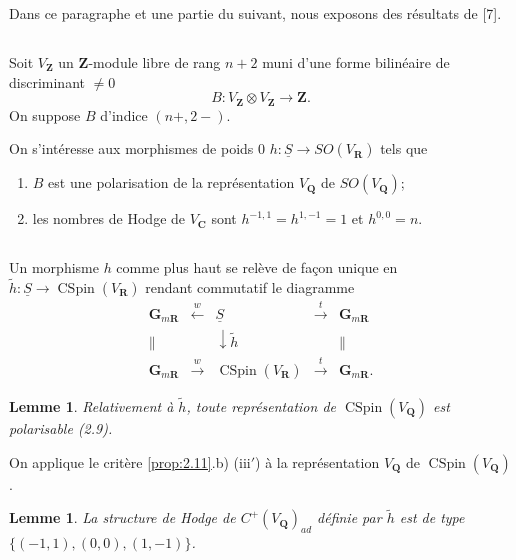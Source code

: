 \documentclass[11pt]{amsart}
\theoremstyle{plain}
\newtheorem{lemme}[theoreme]{Lemme}
\theoremstyle{definition}
\theoremstyle{remark}
\begin{document}
Dans ce paragraphe et une partie du suivant, nous exposons des r\'esultats de [7].

\subsection*{}
Soit $V_\mathbf{Z}$ un $\mathbf{Z}$-module libre de rang $n+2$ muni d'une forme bilin\'eaire de discriminant $\neq0$
\begin{equation*}
B\colon V_\mathbf{Z}\otimes V_\mathbf{Z}\to\mathbf{Z}.
\end{equation*}
On suppose $B$ d'indice $(n+,2-)$.

On s'int\'eresse aux morphismes de poids $0$ $h\colon\underline{S}\to SO(V_\mathbf{R})$ tels que
\begin{enumerate}
\item $B$ est une polarisation de la repr\'esentation $V_\mathbf{Q}$ de $SO(V_\mathbf{Q})$;
\item les nombres de Hodge de $V_\mathbf{C}$ sont $h^{-1,1}=h^{1,-1}=1$ et $h^{0,0}=n$.
\end{enumerate}

\subsection*{}
Un morphisme $h$ comme plus haut se rel\`eve de fa\c{c}on unique en $\tilde{h}\colon\underline{S}\to\operatorname{CSpin}(V_\mathbf{R})$ rendant commutatif le diagramme
\begin{equation*}
\begin{array}{ccccc}
\mathbf{G}_{m\mathbf{R}} & \xleftarrow{w} & \underline{S} & \xrightarrow{t} & \mathbf{G}_{m\mathbf{R}} \\
\| & & \downarrow{\tilde{h}} & & \| \\
\mathbf{G}_{m\mathbf{R}} & \xrightarrow{w} & \operatorname{CSpin}(V_\mathbf{R}) & \xrightarrow{t} & \mathbf{G}_{m\mathbf{R}}.
\end{array}
\end{equation*}

\begin{lemme}
Relativement \`a $\tilde{h}$, toute repr\'esentation de $\operatorname{CSpin}(V_\mathbf{Q})$ est polarisable (2.9).
\end{lemme}

On applique le crit\`ere \ref{prop:2.11}.b) (iii$'$) \`a la repr\'esentation $V_\mathbf{Q}$ de $\operatorname{CSpin}(V_\mathbf{Q})$.

\begin{lemme}
La structure de Hodge de $C^+(V_\mathbf{Q})_{ad}$ d\'efinie par $\tilde{h}$ est de type $\{(-1,1),(0,0),(1,-1)\}$.
\end{lemme}
\end{document}
